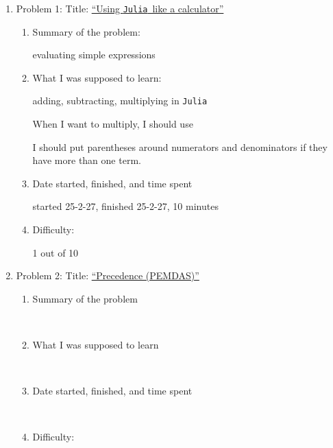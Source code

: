 \documentclass[12pt,answers]{book}
\newcommand{\eb}{\begin{tcolorbox}[width=0.90\textwidth, height=4cm, colback=white]
    ~
  \end{tcolorbox}}
\newcommand{\ebb}{\begin{tcolorbox}[width=0.90\textwidth, height=9cm, colback=white]
    ~
  \end{tcolorbox}}
\newcommand{\ebbb}{\begin{tcolorbox}[width=0.90\textwidth, height=2cm, colback=white]
    ~
    \end{tcolorbox}}
\newcommand{\ebbbb}{\begin{tcolorbox}[width=0.90\textwidth, height=1cm, colback=white]
    ~
    \end{tcolorbox}}
\newcommand{\julia}{{\tt Julia}}
\begin{document}
\begin{enumerate}
  \item Problem 1: \hspace{2cm} Title: \underline{``Using \julia\ like a calculator''}
  \begin{enumerate}
  \item Summary of the problem:
    \begin{tcolorbox}[height=2cm]
           evaluating simple expressions \vspace{1cm}
    \end{tcolorbox}
     \item What I was supposed to learn:
     \begin{tcolorbox}[height=5cm]
      adding, subtracting, multiplying in {\tt Julia}
      \vspace{1cm}

      When I want to multiply, I should use \textasteriskcentered\vspace{1cm}

      I should put parentheses around numerators and denominators if they have more than one term.
    \end{tcolorbox}

  \item Date started, finished, and time spent
    \begin{tcolorbox}[height=1cm]
          started 25-2-27, finished 25-2-27, 10 minutes\vspace{1cm}
    \end{tcolorbox}


  \item Difficulty:
    \begin{tcolorbox}[height=1cm]
      1 out of 10
    \end{tcolorbox}

  \end{enumerate}

\clearpage
\item Problem 2: \hspace{2cm} Title: \underline{``Precedence (PEMDAS)''}
  \begin{enumerate}
  \item Summary of the problem \eb
  \item What I was supposed to learn \ebb
  \item Date started, finished, and time spent \ebbb
  \item Difficulty: \ebbbb
  \end{enumerate}


\end{enumerate}
\end{document}
